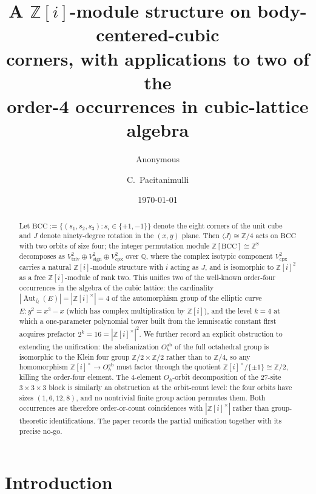 \documentclass[11pt,reqno]{amsart}
\title[A {$\mathbb{Z}[i]$}-module structure on BCC corners]
{A $\mathbb{Z}[i]$-module structure on body-centered-cubic\\
 corners, with applications to two of the\\
 order-4 occurrences in cubic-lattice algebra}
\author{Anonymous}
\author{C.\ Pacitanimulli}
\date{\today}
\theoremstyle{plain}
\theoremstyle{definition}
\theoremstyle{remark}
\numberwithin{equation}{section}
\newcommand{\Aut}{\operatorname{Aut}}
\newcommand{\BCC}{\mathrm{BCC}}
\newcommand{\Vtriv}{V_{\mathrm{triv}}}
\newcommand{\Vsign}{V_{\mathrm{sign}}}
\newcommand{\Vcpx}{V_{\mathrm{cpx}}}
\begin{document}
\begin{abstract}
Let $\BCC := \{(s_1, s_2, s_3) : s_i \in \{+1, -1\}\}$ denote the eight
corners of the unit cube and $J$ denote ninety-degree rotation in the
$(x,y)$ plane. Then $\langle J \rangle \cong \mathbb{Z}/4$ acts on
$\BCC$ with two orbits of size four; the integer permutation module
$\mathbb{Z}[\BCC] \cong \mathbb{Z}^{8}$ decomposes as
$\Vtriv^{2} \oplus \Vsign^{2} \oplus \Vcpx^{2}$ over $\mathbb{Q}$,
where the complex isotypic component $\Vcpx^{2}$ carries a natural
$\mathbb{Z}[i]$-module structure with $i$ acting as $J$, and is
isomorphic to $\mathbb{Z}[i]^{2}$ as a free $\mathbb{Z}[i]$-module of
rank two. This unifies two of the well-known order-four occurrences
in the algebra of the cubic lattice: the cardinality
$|\Aut_{\overline{\mathbb{Q}}}(E)| = |\mathbb{Z}[i]^{\times}| = 4$
of the automorphism group of the elliptic curve
$E\colon y^{2} = x^{3} - x$ (which has complex multiplication by
$\mathbb{Z}[i]$), and the level $k = 4$ at which a one-parameter
polynomial tower built from the lemniscatic constant first acquires
prefactor $2^{k} = 16 = |\mathbb{Z}[i]^{\times}|^{2}$. We further
record an explicit obstruction to extending the unification: the
abelianization $O_{h}^{\mathrm{ab}}$ of the full octahedral group is
isomorphic to the Klein four group $\mathbb{Z}/2 \times \mathbb{Z}/2$
rather than to $\mathbb{Z}/4$, so any homomorphism
$\mathbb{Z}[i]^{\times} \to O_{h}^{\mathrm{ab}}$ must factor through
the quotient $\mathbb{Z}[i]^{\times} / \{\pm 1\} \cong \mathbb{Z}/2$,
killing the order-four element. The $4$-element $O_{h}$-orbit
decomposition of the $27$-site $3 \times 3 \times 3$ block is
similarly an obstruction at the orbit-count level: the four orbits
have sizes $(1, 6, 12, 8)$, and no nontrivial finite group action
permutes them. Both occurrences are therefore order-or-count
coincidences with $|\mathbb{Z}[i]^{\times}|$ rather than
group-theoretic identifications. The paper records the partial
unification together with its precise no-go.
\end{abstract}

\maketitle

\section{Introduction}
\label{sec:intro}
\end{document}
